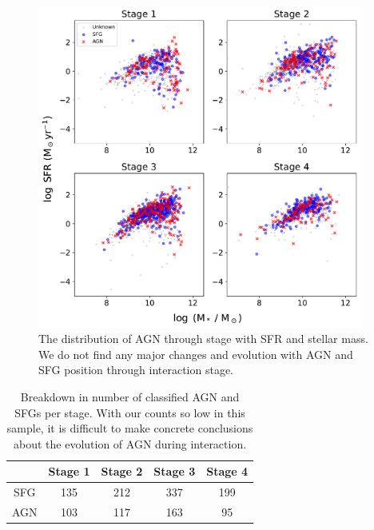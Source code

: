 \begin{figure}
    \centering
    \includegraphics[width=0.95\textwidth]{Chapter3/figures/agn-stage-dist.pdf}
    \caption{The distribution of AGN through stage with SFR and stellar mass. We do not find any major changes and evolution with AGN and SFG position through interaction stage. }
    \label{fig:agn-stage}
\end{figure}

\begin{table}
    \centering
    \begin{tabular}{|c|c|c|c|c|}
	\hline
          & Stage 1 & Stage 2 & Stage 3 & Stage 4 \\
          \hline
          SFG & 135 & 212 & 337 & 199 \\
          AGN & 103 & 117 & 163 & 95 \\
	\hline
    \end{tabular}
    \caption{Breakdown in number of classified AGN and SFGs per stage. With our counts so low in this sample, it is difficult to make concrete conclusions about the evolution of AGN during interaction.}
    \label{tab:agn-sfg-breakdown}
\end{table}

